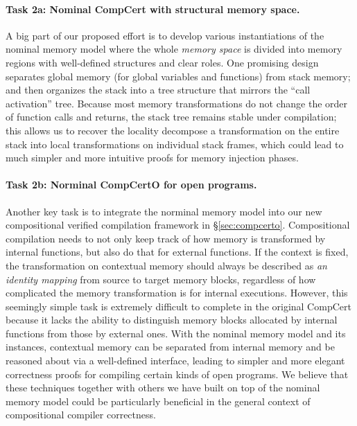 \vspace*{-2ex}
\paragraph*{Task 2a: Nominal CompCert with structural memory space.}
A big part of our proposed effort is to develop various instantiations
of the nominal memory model where the whole {\em memory space} is
divided into memory regions with well-defined structures and clear
roles. One promising design~\cite{wang2022} separates global memory
(for global variables and functions) from stack memory; and then
organizes the stack into a tree structure that mirrors the ``call
activation'' tree.  Because most memory transformations do not change
the order of function calls and returns, the stack tree remains stable
under compilation; this allows us to recover the locality decompose a
transformation on the entire stack into local transformations on
individual stack frames, which could lead to much simpler and more
intuitive proofs for memory injection phases.

\vspace*{-2ex}
\paragraph*{Task 2b: Norminal CompCertO for open programs.}
Another key task is to integrate the norminal memory model into our
new compositional verified compilation framework in
\S\ref{sec:compcerto}.  Compositional compilation needs to not only
keep track of how memory is transformed by internal functions, but
also do that for external functions.  If the context is fixed, the
transformation on contextual memory should always be described as
\emph{an identity mapping} from source to target memory blocks,
regardless of how complicated the memory transformation is for
internal executions.  However, this seemingly simple task is extremely
difficult to complete in the original CompCert because it lacks the
ability to distinguish memory blocks allocated by internal functions
from those by external ones. With the nominal memory model and its
instances, contextual memory can be separated from internal memory and
be reasoned about via a well-defined interface, leading to simpler and
more elegant correctness proofs for compiling certain kinds of open
programs. We believe that these techniques together with others we
have built on top of the nominal memory model could be particularly
beneficial in the general context of compositional compiler
correctness.

